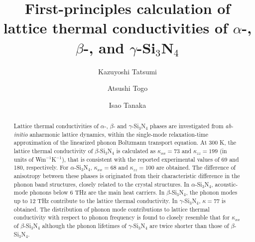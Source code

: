 \documentclass[twocolumn,amsmath,amssymb,a4paper,prb,superscriptaddress,floatfix]{revtex4-1}
\begin{document}
\title{First-principles calculation of lattice thermal
conductivities of $\alpha$-, $\beta$-, and $\gamma$-Si$_3$N$_4$}

\author{Kazuyoshi Tatsumi} 

\author{Atsushi Togo}

\author{Isao Tanaka}

\begin{abstract}
Lattice thermal conductivities of $\alpha$-, $\beta$- and $\gamma$-Si$_3$N$_4$
phases are investigated from {\it ab-initio} anharmonic lattice dynamics, within
the single-mode relaxation-time approximation of the linearized phonon Boltzmann
transport equation. At 300 K, the lattice thermal conductivity of
$\beta$-Si$_3$N$_4$ is calculated as $\kappa_{xx}=73$ and $\kappa_{zz}=199$ (in
units of Wm$^{-1}$K$^{-1}$), that is consistent with the reported experimental
values of 69 and 180, respectively. For $\alpha$-Si$_3$N$_4$, $\kappa_{xx}=68$
and $\kappa_{zz}=100$ are obtained.  The difference of anisotropy between these
phases is originated from their characteristic difference in the phonon band
structures, closely related to the crystal structures.  In $\alpha$-Si$_3$N$_4$,
acoustic-mode phonons below 6 THz are the main heat carriers. In
$\beta$-Si$_3$N$_4$, the phonon modes up to 12 THz contribute to the lattice
thermal conductivity. In $\gamma$-Si$_3$N$_4$, $\kappa=77$ is obtained. The
distribution of phonon mode contributions to lattice thermal conductivity with
respect to phonon frequency is found to closely resemble that for $\kappa_{xx}$
of $\beta$-Si$_3$N$_4$ although the phonon lifetimes of $\gamma$-Si$_3$N$_4$ are
twice shorter than those of $\beta$-Si$_3$N$_4$.
\end{abstract}

\maketitle
\end{document}

